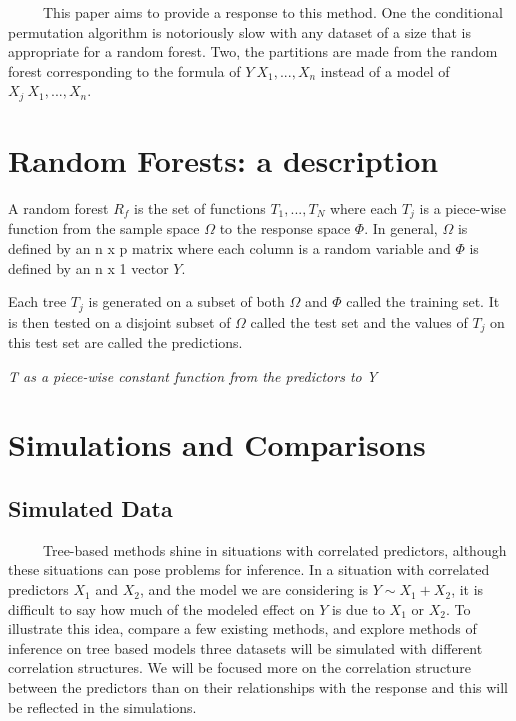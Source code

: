\documentclass[12pt,twoside]{reedthesis}
\begin{document}
  ~~~~~This paper aims to provide a response to this method. One the
  conditional permutation algorithm is notoriously slow with any dataset
  of a size that is appropriate for a random forest. Two, the partitions
  are made from the random forest corresponding to the formula of
  \(Y~X_1,...,X_n\) instead of a model of \(X_j~X_1,...,X_n\).
  
  \chapter{Random Forests: a
  description}\label{random-forests-a-description}
  
  A random forest \(R_f\) is the set of functions \(T_1,...,T_N\) where
  each \(T_j\) is a piece-wise function from the sample space \(\Omega\)
  to the response space \(\Phi\). In general, \(\Omega\) is defined by an
  n x p matrix where each column is a random variable and \(\Phi\) is
  defined by an n x 1 vector \(Y\).
  
  Each tree \(T_j\) is generated on a subset of both \(\Omega\) and
  \(\Phi\) called the training set. It is then tested on a disjoint subset
  of \(\Omega\) called the test set and the values of \(T_j\) on this test
  set are called the predictions.
  
  \emph{T as a piece-wise constant function from the predictors to Y}
  
  \chapter{Simulations and Comparisons}\label{simulations-and-comparisons}
  
  \section{Simulated Data}\label{simulated-data}
  
  ~~~~~Tree-based methods shine in situations with correlated predictors,
  although these situations can pose problems for inference. In a
  situation with correlated predictors \(X_1\) and \(X_2\), and the model
  we are considering is \(Y \sim X_1 + X_2\), it is difficult to say how
  much of the modeled effect on \(Y\) is due to \(X_1\) or \(X_2\). To
  illustrate this idea, compare a few existing methods, and explore
  methods of inference on tree based models three datasets will be
  simulated with different correlation structures. We will be focused more
  on the correlation structure between the predictors than on their
  relationships with the response and this will be reflected in the
  simulations.
  
\end{document}
